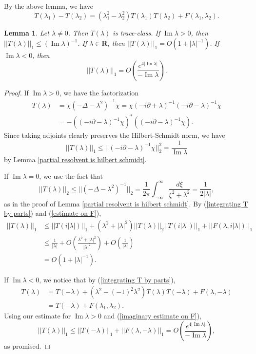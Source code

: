 \documentclass[12pt]{report}
\newcommand{\RR}{\mathbf{R}}
\renewcommand{\Im}{\operatorname{Im}}
\newtheorem{lemma}[theorem]{Lemma}
\theoremstyle{definition}
\begin{document}
By the above lemma, we have
\begin{equation}
\label{integrating T by parts}
  T(\lambda_1) - T(\lambda_2) = (\lambda_1^2 - \lambda_2^2)T(\lambda_1)T(\lambda_2) + F(\lambda_1, \lambda_2).
\end{equation}
\begin{lemma}
\label{T1 is b1}
Let $\lambda \neq 0$. Then $T(\lambda)$ is trace-class. If $\Im \lambda > 0$, then $||T(\lambda)||_1 \leq (\Im \lambda)^{-1}$. If $\lambda \in \RR$, then $||T(\lambda)||_1 = O(1 + |\lambda|^{-1})$. If $\Im \lambda < 0$, then
$$||T(\lambda)||_1 = O\left(\frac{e^{4|\Im \lambda|}}{-\Im \lambda}\right).$$
\end{lemma}
\begin{proof}
If $\Im \lambda > 0$, we have the factorization
\begin{align*}T(\lambda) &= \chi(-\Delta - \lambda^2)^{-1}\chi = \chi(-i\partial + \lambda)^{-1} (-i\partial - \lambda)^{-1} \chi\\ &= -((-i\partial - \lambda)^{-1} \chi)^*((-i\partial - \lambda)^{-1} \chi).\end{align*}
Since taking adjoints clearly preserves the Hilbert-Schmidt norm, we have
$$||T(\lambda)||_1 \leq ||(-i\partial - \lambda)^{-1}\chi||_2^2 = \frac{1}{\Im \lambda}$$
by Lemma \ref{partial resolvent is hilbert schmidt}.

If $\Im \lambda = 0$, we use the fact that
$$||T(\lambda)||_2 \leq ||(-\Delta - \lambda^2)^{-1}||_2 = \frac{1}{2\pi}\int_{-\infty}^\infty \frac{d\xi}{\xi^2 + \lambda^2} = \frac{1}{2|\lambda|},$$
as in the proof of Lemma \ref{partial resolvent is hilbert schmidt}. By (\ref{integrating T by parts}) and (\ref{estimate on F}),
\begin{align*}
||T(\lambda)||_1 &\leq ||T(i|\lambda|)||_1 + (\lambda^2 + |\lambda|^2)||T(\lambda)||_2||T(i|\lambda|)||_1 + ||F(\lambda, i|\lambda|)||_1\\
  &\leq \frac{1}{|\lambda|} + O\left(\frac{\lambda^2 + |\lambda|^2}{|\lambda|^2}\right) + O\left(\frac{1}{|\lambda|}\right)\\
  &= O(1 + |\lambda|^{-1}).
\end{align*}

If $\Im \lambda < 0$, we notice that by (\ref{integrating T by parts}),
\begin{align*}
  T(\lambda) &= T(-\lambda) + (\lambda^2 - (-1)^2\lambda^2)T(\lambda)T(-\lambda) + F(\lambda, -\lambda)\\
  &= T(-\lambda) + F(\lambda_1, \lambda_2).
\end{align*}
Using our estimate for $\Im \lambda > 0$ and (\ref{imaginary estimate on F}),
$$||T(\lambda)||_1 \leq ||T(-\lambda)||_1 + ||F(\lambda, -\lambda)||_1 = O\left(\frac{e^{4|\Im \lambda|}}{-\Im \lambda}\right),$$
as promised.
\end{proof}
\end{document}
